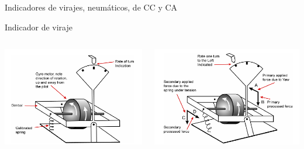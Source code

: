 \begin{frame}{Indicadores de virajes, neum\'aticos, de CC y CA}

  \begin{block}{Indicador de viraje}
    \begin{columns}
      \begin{column}{0.45\textwidth}
        \includegraphics[width=\linewidth]{05.instrumentos.giroscopicos.imagenes/05.02.indicadores.viraje.imagenes/indicador_viraje_01.png}
      \end{column}
      \begin{column}{0.45\textwidth}
        \includegraphics[width=\linewidth]{05.instrumentos.giroscopicos.imagenes/05.02.indicadores.viraje.imagenes/indicador_viraje_02.png}
      \end{column}

    \end{columns}

  \end{block}

\end{frame}


